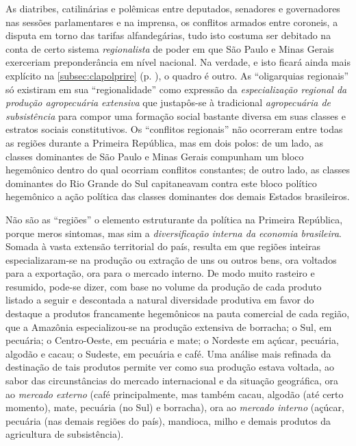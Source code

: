 As diatribes, catilinárias e polêmicas entre deputados, senadores e governadores nas sessões parlamentares e na imprensa, os conflitos armados entre coroneis, a disputa em torno das tarifas alfandegárias, tudo isto costuma ser debitado na conta de certo sistema \textit{regionalista} de poder em que São Paulo e Minas Gerais exerceriam preponderância em nível nacional. Na verdade, e isto ficará ainda mais explícito na \autoref{subsec:clapolprire} (p. \pageref{subsec:clapolprire}), o quadro é outro. As ``oligarquias regionais'' só existiram em sua ``regionalidade'' como expressão da \textit{especialização regional da produção agropecuária extensiva} que justapôs-se à tradicional \textit{agropecuária de subsistência} para compor uma formação social bastante diversa em suas classes e estratos sociais constitutivos. Os ``conflitos regionais'' não ocorreram entre todas as regiões durante a Primeira República, mas em dois polos: de um lado, as classes dominantes de São Paulo e Minas Gerais compunham um bloco hegemônico dentro do qual ocorriam conflitos constantes; de outro lado, as classes dominantes do Rio Grande do Sul capitaneavam contra este bloco político hegemônico a ação política das classes dominantes dos demais Estados brasileiros.

Não são as ``regiões'' o elemento estruturante da política na Primeira República, porque meros sintomas, mas sim a \textit{diversificação interna da economia brasileira}. Somada à vasta extensão territorial do país, resulta em que regiões inteiras especializaram-se na produção ou extração de uns ou outros bens, ora voltados para a exportação, ora para o mercado interno. De modo muito rasteiro e resumido, pode-se dizer, com base no volume da produção de cada produto listado a seguir e descontada a natural diversidade produtiva em favor do destaque a produtos francamente hegemônicos na pauta comercial de cada região, que a Amazônia especializou-se na produção extensiva de borracha; o Sul, em pecuária; o Centro-Oeste, em pecuária e mate; o Nordeste em açúcar, pecuária, algodão e cacau; o Sudeste, em pecuária e café. Uma análise mais refinada da destinação de tais produtos permite ver como sua produção estava voltada, ao sabor das circunstâncias do mercado internacional e da situação geográfica, ora ao \textit{mercado externo} (café principalmente, mas também cacau, algodão (até certo momento), mate, pecuária (no Sul) e borracha), ora ao \textit{mercado interno} (açúcar, pecuária (nas demais regiões do país), mandioca, milho e demais produtos da agricultura de subsistência). 

